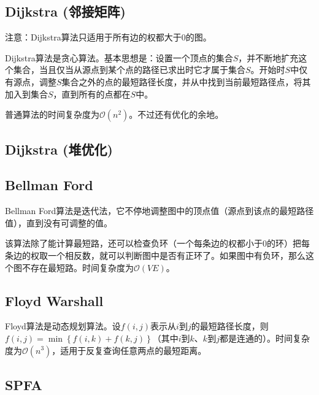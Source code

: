 \subsection{Dijkstra (邻接矩阵)}

注意：Dijkstra算法只适用于所有边的权都大于0的图。

Dijkstra算法是贪心算法。基本思想是：设置一个顶点的集合$S$，并不断地扩充这个集合，当且仅当从源点到某个点的路径已求出时它才属于集合$S$。开始时$S$中仅有源点，调整$S$集合之外的点的最短路径长度，并从中找到当前最短路径点，将其加入到集合$S$，直到所有的点都在$S$中。

普通算法的时间复杂度为$\mathcal{O}(n^2)$。不过还有优化的余地。



\subsection{Dijkstra (堆优化)}


\subsection{Bellman Ford}

Bellman Ford算法是迭代法，它不停地调整图中的顶点值（源点到该点的最短路径值），直到没有可调整的值。

该算法除了能计算最短路，还可以检查负环（一个每条边的权都小于0的环）把每条边的权取一个相反数，就可以判断图中是否有正环了。如果图中有负环，那么这个图不存在最短路。时间复杂度为$\mathcal{O}(VE)$。



\subsection{Floyd Warshall}

Floyd算法是动态规划算法。设$f(i,j)$表示从$i$到$j$的最短路径长度，则$f(i,j)=\min \left\{ f(i, k) + f(k, j) \right\}$（其中$i$到$k$、$k$到$j$都是连通的）。时间复杂度为$\mathcal{O}(n^3)$，适用于反复查询任意两点的最短距离。 



\subsection{SPFA}

